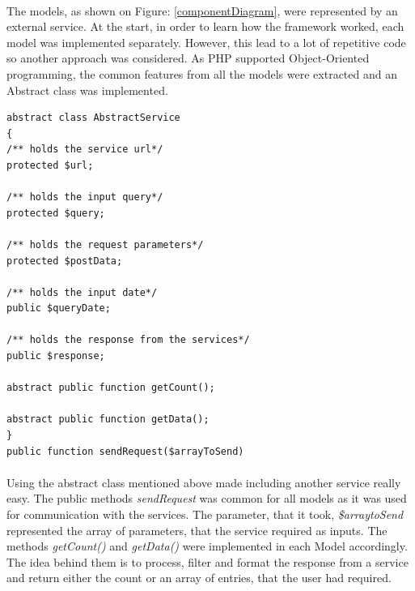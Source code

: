 \documentclass{l4proj}
\begin{document}
\paragraph{}
The models, as shown on Figure: \ref{componentDiagram}, were represented by an external service. At the start, in order to learn how the framework worked, each model was implemented separately. However, this lead to a lot of repetitive code so another approach was considered. As PHP supported Object-Oriented programming, the common features from all the models were extracted and an Abstract class was implemented. 
\begin{lstlisting}
abstract class AbstractService
{
/** holds the service url*/
protected $url;

/** holds the input query*/
protected $query;

/** holds the request parameters*/
protected $postData;

/** holds the input date*/
public $queryDate;

/** holds the response from the services*/
public $response;

abstract public function getCount();

abstract public function getData();
}
public function sendRequest($arrayToSend)    
\end{lstlisting}
\paragraph{}
Using the abstract class mentioned above made including another service really easy. The public methods \textit{sendRequest} was common for all models as it was used for communication with the services. The parameter, that it took, \textit{\$arraytoSend} represented the array of parameters, that the service required as inputs. The methods \textit{getCount()} and \textit{getData()} were implemented in each Model accordingly. The idea behind them is to process, filter and format the response from a service and return either the count or an array of entries, that the user had required.  
\end{document}
